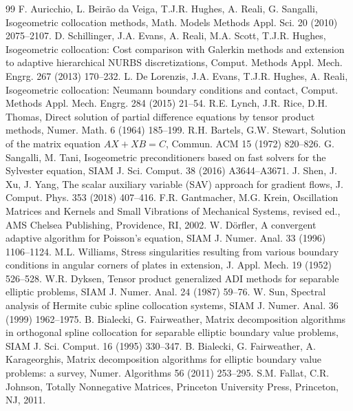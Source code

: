 \documentclass[smallextended,envcountsame]{svjour3}
\begin{document}
\begin{thebibliography}{99}
 F. Auricchio, L. Beir\~ao da Veiga, T.J.R. Hughes, A. Reali, G. Sangalli, Isogeometric collocation methods, Math. Models Methods Appl. Sci. 20 (2010) 2075--2107.
 D. Schillinger, J.A. Evans, A. Reali, M.A. Scott, T.J.R. Hughes, Isogeometric collocation: Cost comparison with Galerkin methods and extension to adaptive hierarchical NURBS discretizations, Comput. Methods Appl. Mech. Engrg. 267 (2013) 170--232.
 L. De Lorenzis, J.A. Evans, T.J.R. Hughes, A. Reali, Isogeometric collocation: Neumann boundary conditions and contact, Comput. Methods Appl. Mech. Engrg. 284 (2015) 21--54.
 R.E. Lynch, J.R. Rice, D.H. Thomas, Direct solution of partial difference equations by tensor product methods, Numer. Math. 6 (1964) 185--199.
 R.H. Bartels, G.W. Stewart, Solution of the matrix equation $AX+XB=C$, Commun. ACM 15 (1972) 820--826.
 G. Sangalli, M. Tani, Isogeometric preconditioners based on fast solvers for the Sylvester equation, SIAM J. Sci. Comput. 38 (2016) A3644--A3671.
 J. Shen, J. Xu, J. Yang, The scalar auxiliary variable (SAV) approach for gradient flows, J. Comput. Phys. 353 (2018) 407--416.
 F.R. Gantmacher, M.G. Krein, Oscillation Matrices and Kernels and Small Vibrations of Mechanical Systems, revised ed., AMS Chelsea Publishing, Providence, RI, 2002.
 W. D\"orfler, A convergent adaptive algorithm for Poisson's equation, SIAM J. Numer. Anal. 33 (1996) 1106--1124.
 M.L. Williams, Stress singularities resulting from various boundary conditions in angular corners of plates in extension, J. Appl. Mech. 19 (1952) 526--528.
 W.R. Dyksen, Tensor product generalized ADI methods for separable elliptic problems, SIAM J. Numer. Anal. 24 (1987) 59--76.
 W. Sun, Spectral analysis of Hermite cubic spline collocation systems, SIAM J. Numer. Anal. 36 (1999) 1962--1975.
 B. Bialecki, G. Fairweather, Matrix decomposition algorithms in orthogonal spline collocation for separable elliptic boundary value problems, SIAM J. Sci. Comput. 16 (1995) 330--347.
 B. Bialecki, G. Fairweather, A. Karageorghis, Matrix decomposition algorithms for elliptic boundary value problems: a survey, Numer. Algorithms 56 (2011) 253--295.
 S.M. Fallat, C.R. Johnson, Totally Nonnegative Matrices, Princeton University Press, Princeton, NJ, 2011.
\end{thebibliography}
\end{document}
